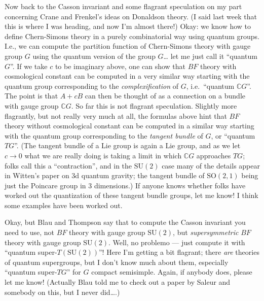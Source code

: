 \documentclass{article}
\begin{document}
Now back to the Casson invariant and some flagrant speculation on my
part concerning Crane and Frenkel's ideas on Donaldson theory. (I said
last week that this is where I was heading, and now I'm almost there!)
Okay: we know how to define Chern-Simons theory in a purely
combinatorial way using quantum groups. I.e., we can compute the
partition function of Chern-Simons theory with gauge group \(G\) using
the quantum version of the group \(G\)\ldots{} let me just call it
``quantum \(G\)''. If we take \(c\) to be imaginary above, one can show
that \(BF\) theory with cosmological constant can be computed in a very
similar way starting with the quantum group corresponding to the
\emph{complexification} of \(G\), i.e.~``quantum \(\mathbb{C}G\)''. The
point is that \(A+cB\) can then be thought of as a connection on a
bundle with gauge group \(\mathbb{C}G\). So far this is not flagrant
speculation. Slightly more flagrantly, but not really very much at all,
the formulas above hint that \(BF\) theory without cosmological constant
can be computed in a similar way starting with the quantum group
corresponding to the \emph{tangent bundle} of \(G\), or ``quantum
\(TG\)''. (The tangent bundle of a Lie group is again a Lie group, and
as we let \(c \to 0\) what we are really doing is taking a limit in
which \(\mathbb{C}G\) approaches \(TG\); folks call this a
``contraction'', and in the \(\mathrm{SU}(2)\) case many of the details
appear in Witten's paper on 3d quantum gravity; the tangent bundle of
\(\mathrm{SO}(2,1)\) being just the Poincare group in 3 dimensions.) If
anyone knows whether folks have worked out the quantization of these
tangent bundle groups, let me know! I think some examples have been
worked out.

Okay, but Blau and Thompson say that to compute the Casson invariant you
need to use, not \(BF\) theory with gauge group \(\mathrm{SU}(2)\), but
\emph{supersymmetric} \(BF\) theory with gauge group \(\mathrm{SU}(2)\).
Well, no problemo --- just compute it with ``quantum
super-\(T(\mathrm{SU}(2))\)''! Here I'm getting a bit flagrant; there
\emph{are} theories of quantum supergroups, but I don't know much about
them, especially ``quantum super-\(TG\)'' for \(G\) compact semisimple.
Again, if anybody does, please let me know! (Actually Blau told me to
check out a paper by Saleur and somebody on this, but I never
did\ldots.)
\end{document}
